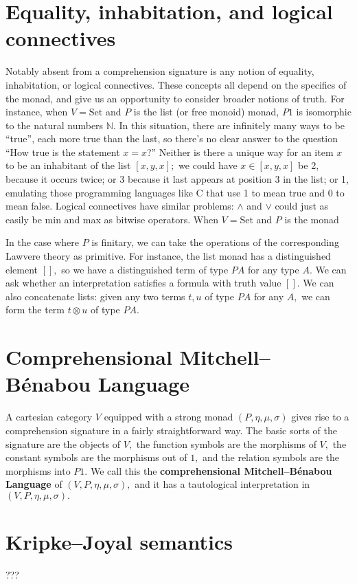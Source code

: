\documentclass{article}
\begin{document}
\section{Equality, inhabitation, and logical connectives}
Notably absent from a comprehension signature is any notion of equality, inhabitation, or logical connectives.  These concepts all depend on the specifics of the monad, and give us an opportunity to consider broader notions of truth.  For instance, when $V=\mbox{Set}$ and $P$ is the list (or free monoid) monad, $P1$ is isomorphic to the natural numbers $\mathbb{N}.$  In this situation, there are infinitely many ways to be ``true'', each more true than the last, so there's no clear answer to the question ``How true is the statement $x=x$?''  Neither is there a unique way for an item $x$ to be an inhabitant of the list $[x, y, x];$ we could have $x \in [x, y, x]$ be 2, because it occurs twice; or 3 because it last appears at position 3 in the list; or 1, emulating those programming languages like C that use 1 to mean true and 0 to mean false.  Logical connectives have similar problems: $\land$ and $\lor$ could just as easily be min and max as bitwise operators.  When $V=\mbox{Set}$ and $P$ is the monad 

In the case where $P$ is finitary, we can take the operations of the corresponding Lawvere theory as primitive.  For instance, the list monad has a distinguished element $[],$ so we have a distinguished term of type $PA$ for any type $A.$  We can ask whether an interpretation satisfies a formula with truth value $[].$  We can also concatenate lists: given any two terms $t, u$ of type $PA$ for any $A,$ we can form the term $t \otimes u$ of type $PA.$



\section{Comprehensional Mitchell--B\'enabou Language}

A cartesian category $V$ equipped with a strong monad $(P, \eta, \mu, \sigma)$ gives rise to a comprehension signature in a fairly straightforward way.  The basic sorts of the signature are the objects of $V,$ the function symbols are the morphisms of $V,$ the constant symbols are the morphisms out of $1,$ and the relation symbols are the morphisms into $P1.$  We call this the {\bf comprehensional Mitchell--B\'enabou Language} of $(V, P, \eta, \mu, \sigma),$ and it has a tautological interpretation in $(V, P, \eta, \mu, \sigma).$

\section{Kripke--Joyal semantics}

???
\end{document}
